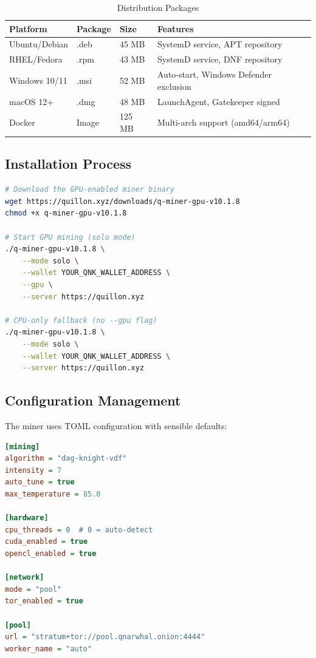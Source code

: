 \documentclass[11pt,a4paper]{article}
\begin{document}
\begin{table}[H]
\centering
\begin{tabular}{|l|l|l|l|}
\hline
\textbf{Platform} & \textbf{Package} & \textbf{Size} & \textbf{Features} \\
\hline
Ubuntu/Debian & .deb & 45 MB & SystemD service, APT repository \\
RHEL/Fedora & .rpm & 43 MB & SystemD service, DNF repository \\
Windows 10/11 & .msi & 52 MB & Auto-start, Windows Defender exclusion \\
macOS 12+ & .dmg & 48 MB & LaunchAgent, Gatekeeper signed \\
Docker & Image & 125 MB & Multi-arch support (amd64/arm64) \\
\hline
\end{tabular}
\caption{Distribution Packages}
\end{table}

\subsection{Installation Process}

\begin{lstlisting}[language=bash, caption=Linux Installation (GPU Mining)]
# Download the GPU-enabled miner binary
wget https://quillon.xyz/downloads/q-miner-gpu-v10.1.8
chmod +x q-miner-gpu-v10.1.8

# Start GPU mining (solo mode)
./q-miner-gpu-v10.1.8 \
    --mode solo \
    --wallet YOUR_QNK_WALLET_ADDRESS \
    --gpu \
    --server https://quillon.xyz

# CPU-only fallback (no --gpu flag)
./q-miner-gpu-v10.1.8 \
    --mode solo \
    --wallet YOUR_QNK_WALLET_ADDRESS \
    --server https://quillon.xyz
\end{lstlisting}

\subsection{Configuration Management}

The miner uses TOML configuration with sensible defaults:

\begin{lstlisting}[language=ini, caption=Configuration Example]
[mining]
algorithm = "dag-knight-vdf"
intensity = 7
auto_tune = true
max_temperature = 85.0

[hardware]
cpu_threads = 0  # 0 = auto-detect
cuda_enabled = true
opencl_enabled = true

[network]
mode = "pool"
tor_enabled = true

[pool]
url = "stratum+tor://pool.qnarwhal.onion:4444"
worker_name = "auto"
\end{lstlisting}
\end{document}

